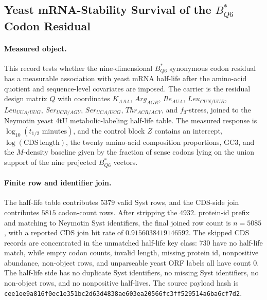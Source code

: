 \subsection{Yeast mRNA-Stability Survival of the $B^{\ast}_{Q6}$ Codon Residual}
\label{sec:bioreality-q6-mrna-stability-sqm-yeast}

\paragraph{Measured object.}
This record tests whether the nine-dimensional $B^{\ast}_{Q6}$ synonymous codon residual has a measurable association with yeast mRNA half-life after the amino-acid quotient and sequence-level covariates are imposed.  The carrier is the residual design matrix $Q$ with coordinates $K_{AAA}$, $Arg_{AGR}$, $Ile_{AUA}$, $Leu_{CUN/UUR}$, $Leu_{UUA/UUG}$, $Ser_{UCR/AGY}$, $Ser_{UCA/UCG}$, $Thr_{ACR/ACY}$, and $f_3$-stress, joined to the Neymotin yeast 4tU metabolic-labeling half-life table.  The measured response is $\log_{10}(t_{1/2}\text{ minutes})$, and the control block $Z$ contains an intercept, $\log(\mathrm{CDS\ length})$, the twenty amino-acid composition proportions, GC3, and the $M$-density baseline given by the fraction of sense codons lying on the union support of the nine projected $B^{\ast}_{Q6}$ vectors.

\paragraph{Finite row and identifier join.}
The half-life table contributes $5379$ valid Syst rows, and the CDS-side join contributes $5815$ codon-count rows.  After stripping the $4932.$ protein-id prefix and matching to Neymotin Syst identifiers, the final joined row count is $n=5085$, with a reported CDS join hit rate of $0.9156038419146592$.  The skipped CDS records are concentrated in the unmatched half-life key class: $730$ have no half-life match, while empty codon counts, invalid length, missing protein id, nonpositive abundance, non-object rows, and unparseable yeast ORF labels all have count $0$.  The half-life side has no duplicate Syst identifiers, no missing Syst identifiers, no non-object rows, and no nonpositive half-lives.  The source payload hash is \texttt{cee1ee9a816f0ec1e351bc2d63d4838ae603ea20566fc3ff529514a6ba6cf7d2}.

